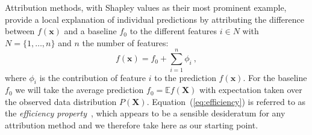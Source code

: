 \documentclass{article}
\newcommand{\vX}{\mathbf{X}}
\newcommand{\vx}{\mathbf{x}}
\newcommand{\expectation}{\mathbb{E}}
\newcommand{\contribution}{{\phi}}
\newcommand{\allfeatures}{{N}}
\begin{document}
Attribution methods, with Shapley values as their most prominent example, provide a local explanation of individual predictions by attributing the difference between $f(\vx)$ and a baseline $f_0$ to the different features $i \in \allfeatures$ with $\allfeatures = \{1,\ldots,n\}$ and $n$ the number of features:
\begin{equation}
f(\vx) = f_0 + \sum_{i=1}^n \contribution_i \: ,
\label{eq:efficiency}
\end{equation}
where $\contribution_i$ is the contribution of feature $i$ to the prediction $f(\vx)$. For the baseline $f_0$ we will take the average prediction $f_0 = \expectation f(\vX)$ with expectation taken over the observed data distribution $P(\vX)$.
Equation~(\ref{eq:efficiency}) is referred to as the {\em efficiency property}~\cite{shapley1953value}, which appears to be a sensible desideratum for any attribution method and we therefore take here as our starting point.
\end{document}
